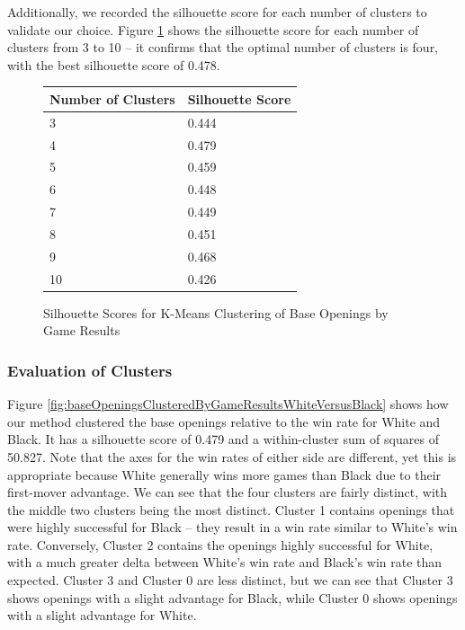 \documentclass[a4paper, 11pt]{article}
\begin{document}
Additionally, we recorded the silhouette score for each number of clusters to validate our choice. Figure \ref{fig:silhouetteScoresForBaseOpeningsClusteredByGameResults} shows the silhouette score for each number of clusters from 3 to 10 -- it confirms that the optimal number of clusters is four, with the best silhouette score of 0.478.

\begin{figure}[H]
    \centering
    \caption{Silhouette Scores for K-Means Clustering of Base Openings by Game Results}
    \label{fig:silhouetteScoresForBaseOpeningsClusteredByGameResults}
    \begin{tabular}{| l | l |} 
        \hline
        \bf{Number of Clusters} & \bf{Silhouette Score} \\ [0.5ex] 
        \hline
        3 & 0.444 \\
        \hline
        4 & 0.479 \\
        \hline
        5 & 0.459 \\
        \hline
        6 & 0.448 \\
        \hline
        7 & 0.449 \\
        \hline
        8 & 0.451 \\
        \hline
        9 & 0.468 \\
        \hline
        10 & 0.426 \\
        \hline
    \end{tabular}
\end{figure}

\subsubsection{Evaluation of Clusters}
Figure \ref{fig:baseOpeningsClusteredByGameResultsWhiteVersusBlack} shows how our method clustered the base openings relative to the win rate for White and Black. It has a silhouette score of 0.479 and a within-cluster sum of squares of 50.827. Note that the axes for the win rates of either side are different, yet this is appropriate because White generally wins more games than Black due to their first-mover advantage. We can see that the four clusters are fairly distinct, with the middle two clusters being the most distinct. Cluster 1 contains openings that were highly successful for Black -- they result in a win rate similar to White's win rate. Conversely, Cluster 2 contains the openings highly successful for White, with a much greater delta between White's win rate and Black's win rate than expected. Cluster 3 and Cluster 0 are less distinct, but we can see that Cluster 3 shows openings with a slight advantage for Black, while Cluster 0 shows openings with a slight advantage for White.
\end{document}
